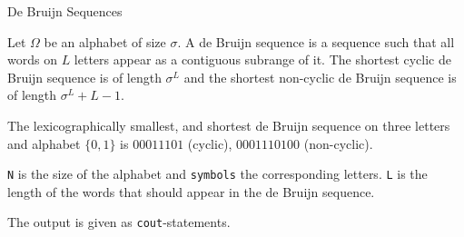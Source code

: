 \begin{algorithm}{De Bruijn Sequences}

\desc
Let $\Omega$ be an alphabet of size $\sigma$. A de Bruijn sequence is
a sequence such that all words on $L$ letters appear as a contiguous
subrange of it.  The shortest cyclic de Bruijn sequence is of
length $\sigma^L$ and the shortest non-cyclic de Bruijn sequence is of
length $\sigma^L+L-1$.

The lexicographically smallest, and shortest de Bruijn sequence on
three letters and alphabet $\{0,1\}$ is $00011101$ (cyclic),
$0001110100$ (non-cyclic).

{\tt N} is the size of the alphabet and {\tt symbols} the
corresponding letters. {\tt L} is the length of the words that should
appear in the de Bruijn sequence.

The output is given as {\tt cout}-statements.
\end{algorithm}

